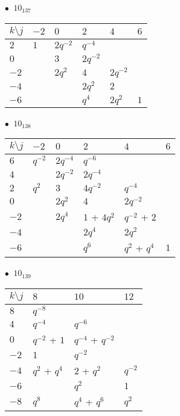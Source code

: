 %
\begin{minipage}{\linewidth}
$\bullet\ $ $10_{137}$ \vspace{0.5em} \\
\begin{tabular}{l|lllll}
$k \setminus j$ & $-2$ & $0$ & $2$ & $4$ & $6$ \\
\hline
$2$ & $1$ & $2q^{-2}$ & $q^{-4}$ &  &  \\
$0$ &  & $3$ & $2q^{-2}$ &  &  \\
$-2$ &  & $2q^{2}$ & $4$ & $2q^{-2}$ &  \\
$-4$ &  &  & $2q^{2}$ & $2$ &  \\
$-6$ &  &  & $q^{4}$ & $2q^{2}$ & $1$ \\
\end{tabular}
\vspace{2em}
\end{minipage}
%
\begin{minipage}{\linewidth}
$\bullet\ $ $10_{138}$ \vspace{0.5em} \\
\begin{tabular}{l|lllll}
$k \setminus j$ & $-2$ & $0$ & $2$ & $4$ & $6$ \\
\hline
$6$ & $q^{-2}$ & $2q^{-4}$ & $q^{-6}$ &  &  \\
$4$ &  & $2q^{-2}$ & $2q^{-4}$ &  &  \\
$2$ & $q^{2}$ & $3$ & $4q^{-2}$ & $q^{-4}$ &  \\
$0$ &  & $2q^{2}$ & $4$ & $2q^{-2}$ &  \\
$-2$ &  & $2q^{4}$ & $1$ + $4q^{2}$ & $q^{-2}$ + $2$ &  \\
$-4$ &  &  & $2q^{4}$ & $2q^{2}$ &  \\
$-6$ &  &  & $q^{6}$ & $q^{2}$ + $q^{4}$ & $1$ \\
\end{tabular}
\vspace{2em}
\end{minipage}
%
\begin{minipage}{\linewidth}
$\bullet\ $ $10_{139}$ \vspace{0.5em} \\
\begin{tabular}{l|lll}
$k \setminus j$ & $8$ & $10$ & $12$ \\
\hline
$8$ & $q^{-8}$ &  &  \\
$4$ & $q^{-4}$ & $q^{-6}$ &  \\
$0$ & $q^{-2}$ + $1$ & $q^{-4}$ + $q^{-2}$ &  \\
$-2$ & $1$ & $q^{-2}$ &  \\
$-4$ & $q^{2}$ + $q^{4}$ & $2$ + $q^{2}$ & $q^{-2}$ \\
$-6$ &  & $q^{2}$ & $1$ \\
$-8$ & $q^{8}$ & $q^{4}$ + $q^{6}$ & $q^{2}$ \\
\end{tabular}
\vspace{2em}
\end{minipage}
